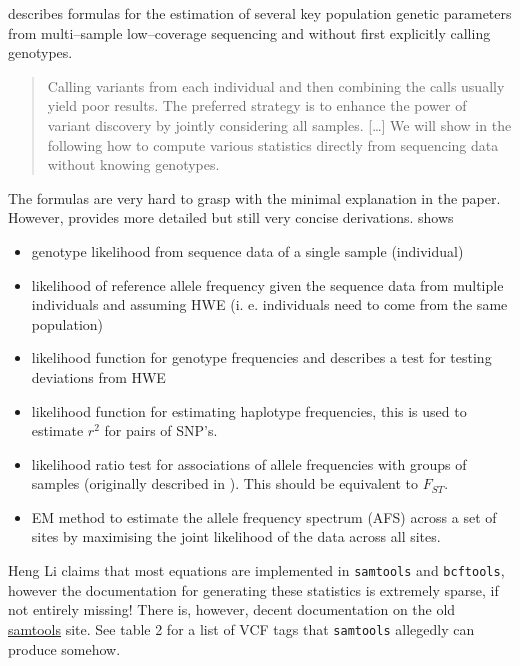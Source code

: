 \documentclass{article}\usepackage[]{graphicx}\usepackage[]{color}
\begin{document}
\cite{Li2011} describes formulas for the estimation of several key population genetic parameters from multi--sample low--coverage sequencing and without first explicitly calling genotypes.
\begin{quotation}
Calling variants from each individual and then combining the calls usually yield poor results. The preferred strategy is to enhance the power of variant discovery by jointly considering all samples.
[\dots]
We will show in the following how to compute various statistics directly from sequencing data without knowing genotypes.
\end{quotation}
The formulas are very hard to grasp with the minimal explanation in the paper. However, \cite{Li2010c} provides more detailed but still very concise derivations.
\cite{Li2011} shows 
\begin{itemize}
\item genotype likelihood from sequence data of a single sample (individual)
\item likelihood of reference allele frequency given the sequence data from multiple individuals and assuming HWE (i. e. individuals need to come from the same population)
\item likelihood function for genotype frequencies and describes a test for testing deviations from HWE
\item likelihood function for estimating haplotype frequencies, this is used to estimate $r^{2}$ for pairs of SNP's.
\item likelihood ratio test for associations of allele frequencies with groups of samples (originally described in \citealt{Kim2011}). This should be equivalent to $F_{ST}$.
\item EM method to estimate the allele frequency spectrum (AFS) across a set of sites by maximising the joint likelihood of the data across all sites.
\end{itemize}
Heng Li claims that most equations are implemented in \texttt{samtools} and \texttt{bcftools}, however the documentation for generating these statistics is extremely sparse, if not entirely missing! There is, however, decent documentation on the old \href{http://samtools.sourceforge.net/mpileup.shtml}{samtools} site. See table 2 for a list of VCF tags that \texttt{samtools} allegedly can produce somehow.

\end{document}
